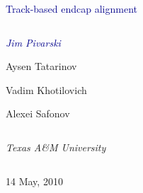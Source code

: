\documentclass[compress]{beamer}
\begin{document}
\begin{frame}
\vfill
\begin{center}
\textcolor{darkblue}{\Large Track-based endcap alignment}

\vfill
\begin{columns}
\begin{center}
\large
\textcolor{darkblue}{\it Jim Pivarski}

Aysen Tatarinov

Vadim Khotilovich

Alexei Safonov
\end{center}
\end{columns}

\begin{columns}
\begin{center}
\scriptsize
{\it Texas A\&M University}
\end{center}
\end{columns}

\vfill
14 May, 2010

\end{center}
\end{frame}


\small
\end{document}
